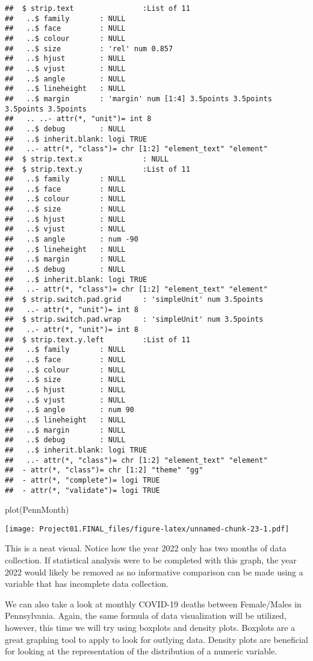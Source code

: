 \documentclass[
]{article}
\newenvironment{Shaded}{\begin{snugshade}}{\end{snugshade}}
\newcommand{\FunctionTok}[1]{\textcolor[rgb]{0.00,0.00,0.00}{#1}}
\newcommand{\NormalTok}[1]{#1}
\begin{document}
\begin{verbatim}
##  $ strip.text                :List of 11
##   ..$ family       : NULL
##   ..$ face         : NULL
##   ..$ colour       : NULL
##   ..$ size         : 'rel' num 0.857
##   ..$ hjust        : NULL
##   ..$ vjust        : NULL
##   ..$ angle        : NULL
##   ..$ lineheight   : NULL
##   ..$ margin       : 'margin' num [1:4] 3.5points 3.5points 3.5points 3.5points
##   .. ..- attr(*, "unit")= int 8
##   ..$ debug        : NULL
##   ..$ inherit.blank: logi TRUE
##   ..- attr(*, "class")= chr [1:2] "element_text" "element"
##  $ strip.text.x              : NULL
##  $ strip.text.y              :List of 11
##   ..$ family       : NULL
##   ..$ face         : NULL
##   ..$ colour       : NULL
##   ..$ size         : NULL
##   ..$ hjust        : NULL
##   ..$ vjust        : NULL
##   ..$ angle        : num -90
##   ..$ lineheight   : NULL
##   ..$ margin       : NULL
##   ..$ debug        : NULL
##   ..$ inherit.blank: logi TRUE
##   ..- attr(*, "class")= chr [1:2] "element_text" "element"
##  $ strip.switch.pad.grid     : 'simpleUnit' num 3.5points
##   ..- attr(*, "unit")= int 8
##  $ strip.switch.pad.wrap     : 'simpleUnit' num 3.5points
##   ..- attr(*, "unit")= int 8
##  $ strip.text.y.left         :List of 11
##   ..$ family       : NULL
##   ..$ face         : NULL
##   ..$ colour       : NULL
##   ..$ size         : NULL
##   ..$ hjust        : NULL
##   ..$ vjust        : NULL
##   ..$ angle        : num 90
##   ..$ lineheight   : NULL
##   ..$ margin       : NULL
##   ..$ debug        : NULL
##   ..$ inherit.blank: logi TRUE
##   ..- attr(*, "class")= chr [1:2] "element_text" "element"
##  - attr(*, "class")= chr [1:2] "theme" "gg"
##  - attr(*, "complete")= logi TRUE
##  - attr(*, "validate")= logi TRUE
\end{verbatim}

\begin{Shaded}
\begin{Highlighting}[]
\FunctionTok{plot}\NormalTok{(PennMonth)}
\end{Highlighting}
\end{Shaded}

\texttt{[image: Project01.FINAL\_files/figure-latex/unnamed-chunk-23-1.pdf]}

This is a neat visual. Notice how the year 2022 only has two months of
data collection. If statistical analysis were to be completed with this
graph, the year 2022 would likely be removed as no informative
comparison can be made using a variable that has incomplete data
collection.

We can also take a look at monthly COVID-19 deaths between Female/Males
in Pennsylvania. Again, the same formula of data visualization will be
utilized, however, this time we will try using boxplots and density
plots. Boxplots are a great graphing tool to apply to look for outlying
data. Density plots are beneficial for looking at the representation of
the distribution of a numeric variable.
\end{document}
